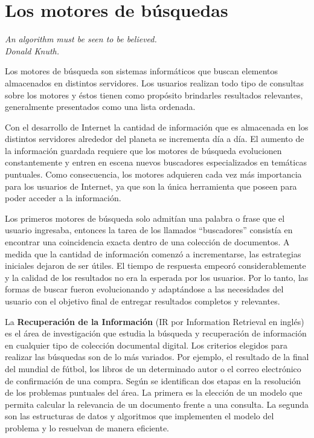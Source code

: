 \section{Los motores de búsquedas}
{\begin{small}%
\begin{flushright}%
\it An algorithm must be seen to be believed.\\Donald Knuth.
\end{flushright}%
\end{small}%
\vspace{.5cm}}
Los motores de búsqueda son sistemas informáticos que buscan elementos almacenados en distintos servidores. Los usuarios realizan todo tipo de consultas sobre los motores y éstos tienen como propósito brindarles resultados relevantes, generalmente presentados como una lista ordenada.

Con el desarrollo de Internet la cantidad de información que es almacenada en los distintos servidores alrededor del planeta se incrementa día a día. El aumento de la información guardada requiere que los motores de búsqueda evolucionen constantemente y entren en escena nuevos buscadores especializados en temáticas puntuales. Como consecuencia, los motores adquieren cada vez más importancia para los usuarios de Internet, ya que son la única herramienta que poseen para poder acceder a la información.

Los primeros motores de búsqueda solo admitían una palabra o frase que el usuario ingresaba, entonces la tarea de los llamados ``buscadores'' consistía en encontrar una coincidencia exacta dentro de una colección de documentos. A medida que la cantidad de información comenzó a incrementarse, las estrategias iniciales dejaron de ser útiles.
El tiempo de respuesta empeoró considerablemente y la calidad de los resultados no era la esperada por los usuarios. Por lo tanto, las formas de buscar fueron evolucionando y adaptándose a las necesidades del usuario con el objetivo final de entregar resultados completos y relevantes.

La \textbf{Recuperación de la Información} (IR por Information Retrieval en inglés) \cite{Baeza-Yates:1999:MIR:553876,Manning:2008:IIR:1394399,Zobel:2006:IFT:1132956.1132959} es el área de investigación que estudia la búsqueda y recuperación de información en cualquier tipo de colección documental digital. Los criterios elegidos para realizar las búsquedas son de lo más variados. Por ejemplo, el resultado de la final del mundial de fútbol, los libros de un determinado autor o el correo electrónico de confirmación de una compra. Según \cite{Baeza-Yates:1999:MIR:553876} se identifican dos etapas en la resolución de los problemas puntuales del área. La primera es la elección de un modelo que permita calcular la relevancia de un documento frente a una consulta. La segunda son las estructuras de datos y algoritmos que implementen el modelo del problema y lo resuelvan de manera eficiente.

